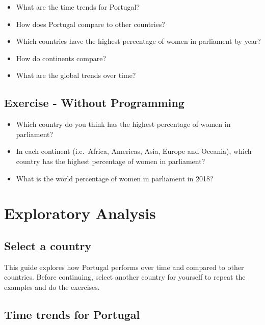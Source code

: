 \documentclass[a4paper,9pt,twocolumn,twoside,printwatermark=false]{pinp}
\providecommand{\tightlist}{%
  \setlength{\itemsep}{0pt}\setlength{\parskip}{0pt}}
\begin{document}
\begin{itemize}
\tightlist
\item
  What are the time trends for Portugal?
\item
  How does Portugal compare to other countries?
\item
  Which countries have the highest percentage of women in parliament by
  year?
\item
  How do continents compare?
\item
  What are the global trends over time?
\end{itemize}

\hypertarget{exercise---without-programming}{%
\subsection{Exercise - Without
Programming}\label{exercise---without-programming}}

\begin{itemize}
\tightlist
\item
  Which country do you think has the highest percentage of women in
  parliament?
\item
  In each continent (i.e.~Africa, Americas, Asia, Europe and Oceania),
  which country has the highest percentage of women in parliament?
\item
  What is the world percentage of women in parliament in 2018?
\end{itemize}

\hypertarget{exploratory-analysis}{%
\section{Exploratory Analysis}\label{exploratory-analysis}}

\hypertarget{select-a-country}{%
\subsection{Select a country}\label{select-a-country}}

This guide explores how Portugal performs over time and compared to
other countries. Before continuing, select another country for yourself
to repeat the examples and do the exercises.

\hypertarget{time-trends-for-portugal}{%
\subsection{Time trends for Portugal}\label{time-trends-for-portugal}}
\end{document}
